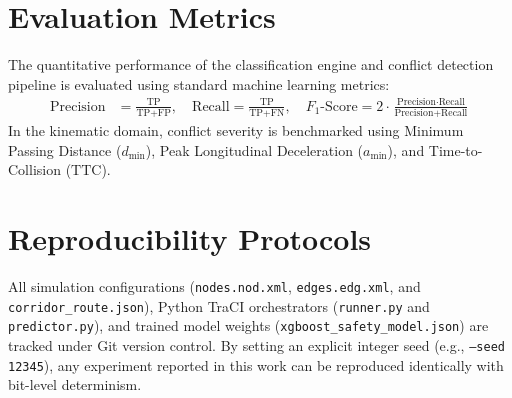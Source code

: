 \section{Evaluation Metrics}
The quantitative performance of the classification engine and conflict detection pipeline is evaluated using standard machine learning metrics:
\begin{align}
    \text{Precision} &= \frac{\text{TP}}{\text{TP} + \text{FP}}, \quad
    \text{Recall} = \frac{\text{TP}}{\text{TP} + \text{FN}}, \quad
    F_1\text{-Score} = 2 \cdot \frac{\text{Precision} \cdot \text{Recall}}{\text{Precision} + \text{Recall}}
\end{align}
In the kinematic domain, conflict severity is benchmarked using Minimum Passing Distance ($d_{\text{min}}$), Peak Longitudinal Deceleration ($a_{\text{min}}$), and Time-to-Collision ($\text{TTC}$).

\section{Reproducibility Protocols}
All simulation configurations (\texttt{nodes.nod.xml}, \texttt{edges.edg.xml}, and \texttt{corridor\_route.json}), Python TraCI orchestrators (\texttt{runner.py} and \texttt{predictor.py}), and trained model weights (\texttt{xgboost\_safety\_model.json}) are tracked under Git version control. By setting an explicit integer seed (e.g., \texttt{--seed 12345}), any experiment reported in this work can be reproduced identically with bit-level determinism.
